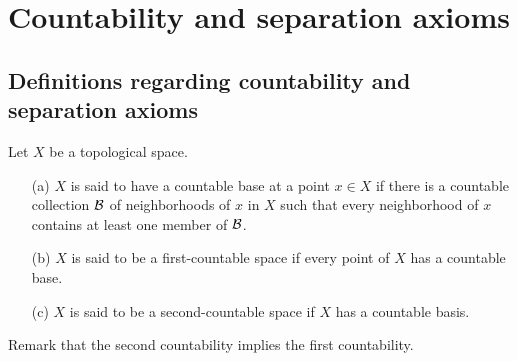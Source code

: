 \section{Countability and separation axioms}

\subsection{Definitions regarding countability and separation axioms}

\begin{defi}
    Let $X$ be a topological space.
    \begin{enumerate}
        \item[(a)]
        {
            $X$ is said to have a countable base at a point $x\in X$ if there is a countable collection ${\mathcal{B}}$ of neighborhoods of $x$ in $X$ such that every neighborhood of $x$ contains at least one member of ${\mathcal{B}}$.
        }
        \item[(b)]
        {
            $X$ is said to be a first-countable space if every point of $X$ has a countable base.
        }
        \item[(c)]
        {
            $X$ is said to be a second-countable space if $X$ has a countable basis.
        }
    \end{enumerate}
    Remark that the second countability implies the first countability.
\end{defi}

